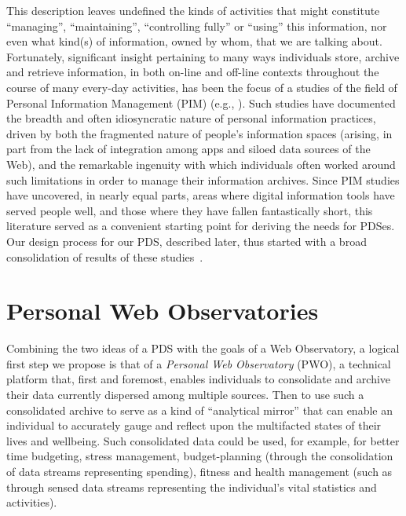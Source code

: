 \documentclass[letterpaper]{sig-alternate}
\begin{document}
This description leaves undefined the kinds of activities that might constitute ``managing'', ``maintaining'', ``controlling fully'' or ``using'' this information, nor even what kind(s) of information, owned by whom, that we are talking about. Fortunately, significant insight pertaining to many ways individuals store, archive and retrieve information, in both on-line and off-line contexts throughout the course of many every-day activities, has been the focus of a studies of the field of Personal Information Management (PIM) (e.g., \cite{sellen2003myth,bernstein2008information,van2011finders}).  Such studies have documented the breadth and often idiosyncratic nature of personal information practices, driven by both the fragmented nature of people's information spaces (arising, in part from the lack of integration among apps and siloed data sources of the Web), and the remarkable ingenuity with which individuals often worked around such limitations in order to manage their information archives.  Since PIM studies have uncovered, in nearly equal parts, areas where digital information tools have served people well, and those where they have fallen fantastically short, this literature served as a convenient starting point for deriving the needs for PDSes.  Our design process for our PDS, described later, thus started with a broad consolidation of results of these studies~\cite{van2012decentralized}.  

\section{Personal Web Observatories}

Combining the two ideas of a PDS with the goals of a Web Observatory, a logical first step we propose is that of a \emph{Personal Web Observatory} (PWO), a technical platform that, first and foremost, enables individuals to consolidate and archive their data currently dispersed among multiple sources. Then to use such a consolidated archive to serve as a kind of ``analytical mirror'' that can enable an individual to accurately gauge and reflect upon the multifacted states of their lives and wellbeing. Such consolidated data could be used, for example, for better time budgeting, stress management, budget-planning (through the consolidation of data streams representing spending), fitness and health management (such as through sensed data streams representing the individual's vital statistics and activities). 
\end{document}
